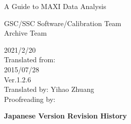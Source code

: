 \documentclass[10pt]{report}
\renewcommand{\_}{\textscale{.5}{\textbf{\textunderscore}}}
\begin{document}
\begin{titlepage}
   \begin{center}
       \vspace*{1cm}

        \Large
        A Guide to MAXI Data Analysis

       \vspace{1cm}
        GSC/SSC Software/Calibration Team\\
        Archive Team

       \vspace{2cm}

       \large
        2021/2/20\\
        \vspace{3cm}
        Translated from:\\
        2015/07/28\\
        Ver.1.2.6\\
        \vspace{2cm}
        Translated by: Yihao Zhuang\\
        Proofreading by: 

       \vfill

   \end{center}
\end{titlepage}

\noindent\normalfont\huge\textbf{Japanese Version Revision History} \\

\
\end{document}
